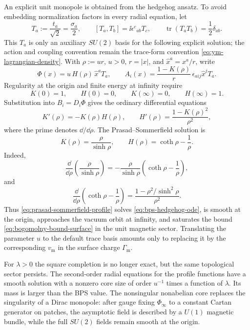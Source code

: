 An explicit unit monopole is obtained from the hedgehog ansatz.  To avoid
embedding normalization factors in every radial equation, let
\[
  T_a:=\frac{t_a}{\sqrt2}=\frac{\sigma_a}{2},
  \qquad
  [T_a,T_b]=\ii\epsilon^c{}_{ab}T_c,
  \qquad
  \operatorname{tr}(T_aT_b)=\frac12\delta_{ab}.
\]
This \(T_a\) is only an auxiliary \(SU(2)\) basis for the following explicit
solution; the action and coupling convention remain the trace-form convention
\eqref{eq:ym-lagrangian-density}.  With
\(\rho:=u r\), \(u>0\), \(r=|x|\), and \(\hat x^a=x^a/r\), write
\begin{equation}
  \Phi(x)=u\,H(\rho)\,\hat x^aT_a,
  \qquad
  A_i(x)=\frac{1-K(\rho)}{r}\,\epsilon_{aij}\hat x^jT_a .
  \label{eq:hedgehog-monopole-ansatz}
\end{equation}
Regularity at the origin and finite energy at infinity require
\[
  K(0)=1,\qquad H(0)=0,\qquad
  K(\infty)=0,\qquad H(\infty)=1 .
\]
Substitution into \(B_i=D_i\Phi\) gives the ordinary differential equations
\begin{equation}
  K'(\rho)=-K(\rho)H(\rho),
  \qquad
  H'(\rho)=\frac{1-K(\rho)^2}{\rho^2},
  \label{eq:bps-hedgehog-ode}
\end{equation}
where the prime denotes \(\dd/\dd\rho\).  The Prasad--Sommerfield solution is
\begin{equation}
  K(\rho)=\frac{\rho}{\sinh\rho},
  \qquad
  H(\rho)=\coth\rho-\frac1{\rho}.
  \label{eq:prasad-sommerfield-profile}
\end{equation}
Indeed,
\[
  \frac{\dd}{\dd\rho}\left(\frac{\rho}{\sinh\rho}\right)
  =
  -\frac{\rho}{\sinh\rho}\left(\coth\rho-\frac1\rho\right),
\]
and
\[
  \frac{\dd}{\dd\rho}\left(\coth\rho-\frac1\rho\right)
  =
  \frac{1-\rho^2/\sinh^2\rho}{\rho^2}.
\]
Thus \eqref{eq:prasad-sommerfield-profile} solves
\eqref{eq:bps-hedgehog-ode}, is smooth at the origin, approaches the vacuum
orbit at infinity, and saturates the bound
\eqref{eq:bogomolny-bound-surface} in the unit magnetic sector.  Translating
the parameter \(u\) to the default trace basis amounts only to replacing it by
the corresponding \(v_{\mathrm m}\) in the surface charge
\(\Gamma_{\mathrm m}\).

For \(\lambda>0\) the square completion is no longer exact, but the same
topological sector persists.  The second-order radial equations for the
profile functions have a smooth solution with a nonzero core size of order
\(u^{-1}\) times a function of \(\lambda\).  Its mass is larger than the BPS
value.  The nonsingular nonabelian core replaces the singularity of a Dirac
monopole: after gauge fixing
\(\Phi_\infty\) to a constant Cartan generator on patches, the asymptotic
field is described by a \(U(1)\) magnetic bundle, while the full \(SU(2)\)
fields remain smooth at the origin.

